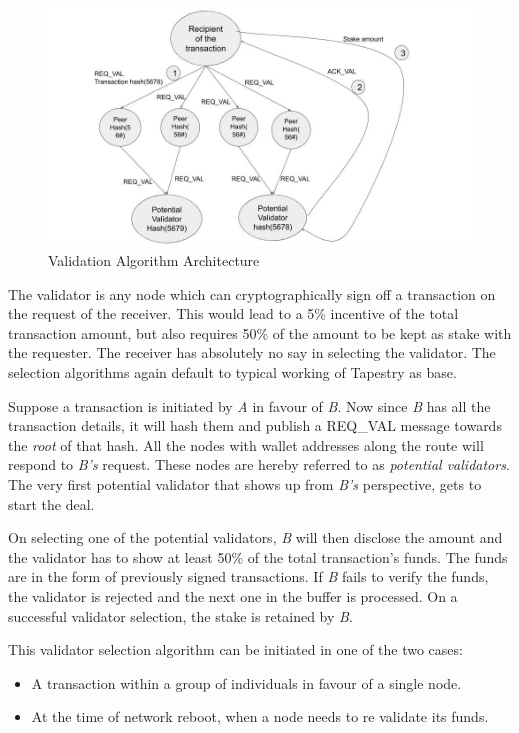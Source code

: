 \documentclass[conference,a4paper,12pt]{IEEEtran}
\begin{document}
	\begin{figure}[h]
	  \includegraphics[width=\linewidth]{validation_algo.jpg}
	  \caption{Validation Algorithm Architecture}
	  \label{Validation Architecture}
	\end{figure}


	The validator is any node which can cryptographically sign off a transaction on the request of the receiver. This would lead to a 5\% incentive of the total transaction amount, but also requires 50\% of the amount to be kept as stake with the requester. The receiver has absolutely no say in selecting the validator. The selection algorithms again default to typical working of Tapestry \cite{tapestry_infra} as base.

	Suppose a transaction is initiated by \textit{A} in favour of \textit{B}. Now since \textit{B} has all the transaction details, it will hash them and publish a REQ\_VAL message towards the \textit{root} of that hash. All the nodes with wallet addresses along the route will respond to \textit{B's} request. These nodes are hereby referred to as \textit{potential validators}. The very first potential validator that shows up from \textit{B's} perspective, gets to start the deal.

	On selecting one of the potential validators, \textit{B} will then disclose the amount and the validator has to show at least 50\% of the total transaction's funds. The funds are in the form of previously signed transactions. If \textit{B} fails to verify the funds, the validator is rejected and the next one in the buffer is processed. On a successful validator selection, the stake is retained by \textit{B}.

	This validator selection algorithm can be initiated in one of the two cases:

	\begin{itemize}
    	\item A transaction within a group of individuals in favour of a single node.
	    \item At the time of network reboot, when a node needs to re validate its funds. 
	\end{itemize}
\end{document}

